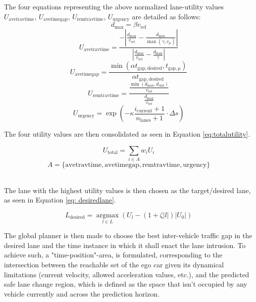 \documentclass[12pt, a4paper]{report}
\DeclareMathOperator*{\argmax}{argmax}
\begin{document}
The four equations representing the above normalized lane-utility values $U_{\mathrm{avetravtime}}$, $U_{\mathrm{avetimegap}}$, $U_{\mathrm{remtravtime}}$, $U_{\mathrm{urgency}}$ are detailed as follows:
\begin{equation}
    d_{\mathrm{max}} = \beta v_{\mathrm{ref}}
\end{equation}
\begin{equation}
    U_{\mathrm{avetravtime}} = \frac{-\left| \frac{d_{\mathrm{max}}}{v_{\mathrm{ref}}} - \frac{d_{\mathrm{max}}}{\max(\gamma,v_{\mu})} \right|}{\left| \frac{d_{\mathrm{max}}}{v_{\mathrm{ref}}} - \frac{d_{\mathrm{max}}}{\gamma} \right|}
\end{equation}
\begin{equation}
    U_{\mathrm{avetimegap}} = \frac{\min(\alpha t_{\mathrm{gap, desired}}, t_{\mathrm{gap, \mu}})}{\alpha t_{\mathrm{gap, desired}}}
\end{equation}
\begin{equation}
    U_{\mathrm{remtravtime}} = \frac{\frac{\min(d_{\mathrm{max}}, d_{\mathrm{end}})}{v_{\mathrm{ref}}}}{\frac{d_\mathrm{max}}{v_\mathrm{ref}}}
\end{equation}
\begin{equation}
    U_{\mathrm{urgency}} = \exp \left( -\kappa\frac{i_{\mathrm{current}}+1}{n_{\mathrm{lanes}}+1} \cdot \Delta s \right) 
\end{equation}

The four utility values are then consolidated as seen in Equation \eqref{eq:totalutility}.

\begin{equation} \label{eq:totalutility}
    U_{\mathrm{total}} = \sum\limits_{i \in A} w_{i}U_{i}
\end{equation}
\begin{equation}
    A = \{\mathrm{avetravtime, avetimegap, remtravtime, urgency}\}
\end{equation}\

The lane with the highest utility values is then chosen as the target/desired lane, as seen in Equation \eqref{eq: desiredlane}.

\begin{equation} \label{eq: desiredlane}
    L_{\mathrm{desired}} = \argmax\limits_{l \in L} \left(U_{l}-(1+\zeta|l|)\left|U_0\right|\right)
\end{equation}

The global planner is then made to choose the best inter-vehicle traffic gap in the desired lane and the time instance in which it shall enact the lane intrusion. To achieve such, a "time-position"-area, is formulated, corresponding to the intersection between the reachable set of the ego car given its dynamical limitations (current velocity, allowed acceleration values, etc.), and the predicted safe lane change region, which is defined as the space that isn't occupied by any vehicle currently and across the prediction horizon.
\end{document}
